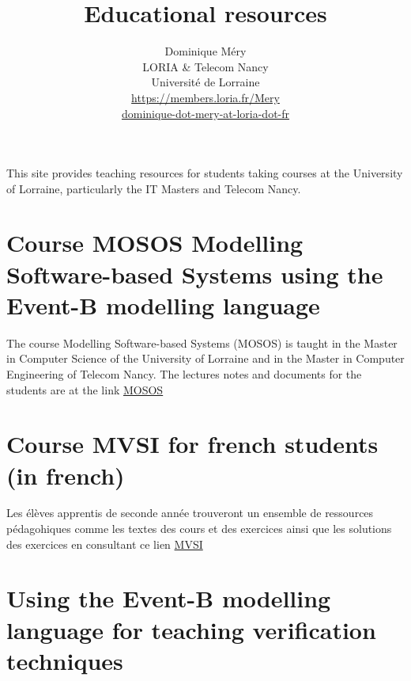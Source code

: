 \documentclass[ 12pt]{article}
\title{Educational resources}
\author{Dominique M\'ery\\
LORIA \& Telecom Nancy\\ Universit\'e de Lorraine\\
\url{https://members.loria.fr/Mery}\\ \url{dominique-dot-mery-at-loria-dot-fr}}
\begin{document}
\large
{}  \setcounter{ex}{1}
\maketitle

This site provides teaching resources for students taking courses at
the University of Lorraine, particularly the IT Masters and Telecom
Nancy.




\section{ Course MOSOS Modelling Software-based Systems using  the
  Event-B modelling language}
\label{sec:course-mosos-modell}


The   course Modelling Software-based Systems (MOSOS) is taught in
the Master  in Computer Science of the University of Lorraine  and in
the Master in Computer Engineering of Telecom Nancy. The  lectures notes  and documents for the students  are  at the link
\href{https://mery54.github.io/teaching/mosos}{MOSOS}



\section{Course MVSI for french students (in french) }



Les élèves    apprentis de seconde année
trouveront un ensemble de ressources pédagohiques comme les 
textes des cours et des exercices ainsi que les solutions des
exercices en consultant ce lien
\href{https://mery54.github.io/teaching/mvsi}{MVSI}


\section{Using  the Event-B modelling language  for teaching verification 
techniques }
\end{document}
